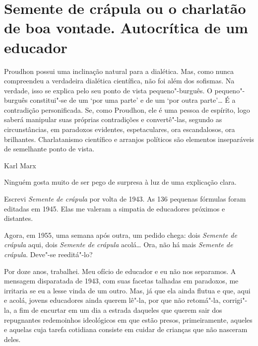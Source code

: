 \movetooddpage
\thispagestyle{empty}
\setcounter{footnote}{0}
\begin{vplace}[0.25]


{\large{}}
\end{vplace}

\pagebreak
\thispagestyle{empty}

\movetooddpage

\section{Semente de crápula ou o charlatão de boa vontade. Autocrítica de um educador}

\bigskip
\bigskip

\epigraph{Proudhon possui uma inclinação natural para a dialética. Mas, como
nunca compreendeu a verdadeira dialética científica, não foi além dos
sofismas. Na verdade, isso se explica pelo seu ponto de vista
pequeno"-burguês. O pequeno"-burguês constitui"-se de um `por uma parte'
e de um `por outra parte'\ldots{} É a contradição personificada. Se, como
Proudhon, ele é uma pessoa de espírito, logo saberá manipular suas
próprias contradições e convertê"-las, segundo as circunstâncias, em
paradoxos evidentes, espetaculares, ora escandalosos, ora brilhantes.
Charlatanismo científico e arranjos políticos são elementos inseparáveis
de semelhante ponto de vista.}{Karl Marx}

Ninguém gosta muito de ser pego de surpresa à luz de uma explicação
clara.

Escrevi \emph{Semente de crápula} por volta de 1943. As 136 pequenas
fórmulas foram editadas em 1945. Elas me valeram a simpatia de
educadores próximos e distantes.

Agora, em 1955, uma semana após outra, um pedido chega: dois
\emph{Semente de crápula} aqui, dois \emph{Semente de crápula}
acolá\ldots{} Ora, não há mais \emph{Semente de crápula}. Deve"-se
reeditá"-lo?

Por doze anos, trabalhei. Meu ofício de educador e eu não nos separamos.
A mensagem disparatada de 1943, com suas facetas talhadas em paradoxos,
me irritaria se eu a lesse vinda de um outro. Mas, já que ela ainda
flutua e que, aqui e acolá, jovens educadores ainda querem lê"-la, por
que não retomá"-la, corrigi"-la, a fim de encurtar em um dia a estrada
daqueles que querem sair dos repugnantes redemoinhos ideológicos em que
estão presos, primeiramente, aqueles e aquelas cuja tarefa cotidiana
consiste em cuidar de crianças que não nasceram deles.

